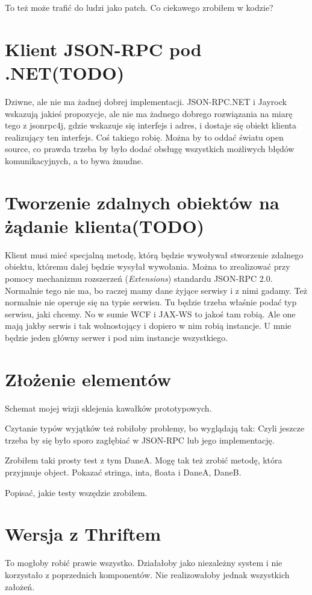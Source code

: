 To też może trafić do ludzi jako patch.
Co ciekawego zrobiłem w kodzie?



\section{Klient JSON-RPC pod .NET(TODO)}
Dziwne, ale nie ma żadnej dobrej implementacji. JSON-RPC.NET i Jayrock wskazują jakieś propozycje, ale nie ma żadnego dobrego rozwiązania na miarę tego z jsonrpc4j, gdzie wskazuje się interfejs i adres, i dostaje się obiekt klienta realizujący ten interfejs.
Coś takiego robię. Można by to oddać światu open source, co prawda trzeba by było dodać obsługę wszystkich możliwych błędów komunikacyjnych, a to bywa żmudne.



\section{Tworzenie zdalnych obiektów na żądanie klienta(TODO)}
Klient musi mieć specjalną metodę, którą będzie wywoływał stworzenie zdalnego obiektu, któremu dalej będzie wysyłał wywołania.
Można to zrealizować przy pomocy mechanizmu rozszerzeń (\emph{Extensions}) standardu JSON-RPC 2.0.
Normalnie tego nie ma, bo raczej mamy dane żyjące serwisy i z nimi gadamy. Też normalnie nie operuje się na typie serwisu. Tu będzie trzeba właśnie podać typ serwisu, jaki chcemy. No w sumie WCF i JAX-WS to jakoś tam robią. Ale one mają jakby serwis i tak wolnostojący i dopiero w nim robią instancje. U mnie będzie jeden główny serwer i pod nim instancje wszystkiego.



\section{Złożenie elementów}
Schemat mojej wizji sklejenia kawałków prototypowych.

Czytanie typów wyjątków też robiłoby problemy, bo wyglądają tak:
Czyli jeszcze trzeba by się było sporo zagłębiać w JSON-RPC lub jego implementację.

Zrobiłem taki prosty test z tym DaneA. Mogę tak też zrobić metodę, która przyjmuje object. Pokazać stringa, inta, floata i DaneA, DaneB.

Popisać, jakie testy wszędzie zrobiłem.

\section{Wersja z Thriftem}
To mogłoby robić prawie wszystko. Działałoby jako niezależny system i nie korzystało z poprzednich komponentów. Nie realizowałoby jednak wszystkich założeń.